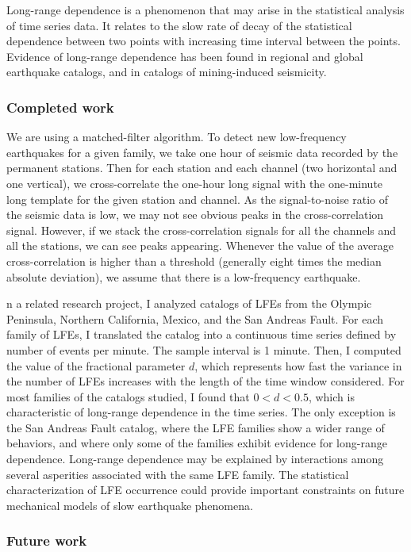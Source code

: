 \documentclass[letterpaper, 12pt]{article}
\begin{document}
Long-range dependence is a phenomenon that may arise in the statistical analysis of time series data. It relates to the slow rate of decay of the statistical dependence between two points with increasing time interval between the points. Evidence of long-range dependence has been found in regional and global earthquake catalogs, and in catalogs of mining-induced seismicity.

\subsubsection*{Completed work}

We are using a matched-filter algorithm. To detect new low-frequency earthquakes for a given family, we take one hour of seismic data recorded by the permanent stations. Then for each station and each channel (two horizontal and one vertical), we cross-correlate the one-hour long signal with the one-minute long template for the given station and channel. As the signal-to-noise ratio of the seismic data is low, we may not see obvious peaks in the cross-correlation signal. However, if we stack the cross-correlation signals for all the channels and all the stations, we can see peaks appearing. Whenever the value of the average cross-correlation is higher than a threshold (generally eight times the median absolute deviation), we assume that there is a low-frequency earthquake.

n a related research project, I analyzed catalogs of LFEs from the Olympic Peninsula, Northern California, Mexico, and the San Andreas Fault. For each family of LFEs, I translated the catalog into a continuous time series defined by number of events per minute. The sample interval is 1 minute. Then, I computed the value of the fractional parameter $d$, which represents how fast the variance in the number of LFEs increases with the length of the time window considered. For most families of the catalogs studied, I found that $0 < d < 0.5$, which is characteristic of long-range dependence in the time series. The only exception is the San Andreas Fault catalog, where the LFE families show a wider range of behaviors, and where only some of the families exhibit evidence for long-range dependence. Long-range dependence may be explained by interactions among several asperities associated with the same LFE family. The statistical characterization of LFE occurrence could provide important constraints on future mechanical models of slow earthquake phenomena.

\subsubsection*{Future work}
\end{document}
